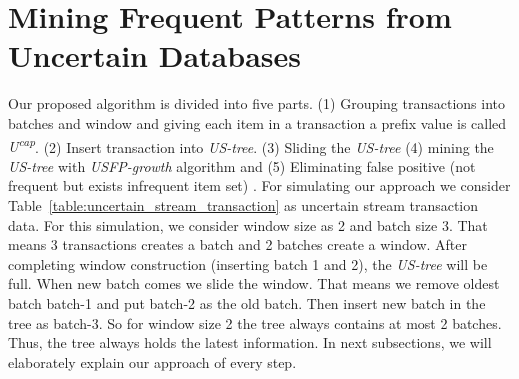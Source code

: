 \section{Mining Frequent Patterns from Uncertain Databases}
    Our proposed algorithm is divided into five parts. (1) Grouping transactions into batches and window and giving each item in a transaction a prefix value is called \emph{U\textsuperscript{cap}}. (2) Insert transaction into \emph {US-tree}. (3) Sliding the \emph {US-tree} (4) mining the \emph {US-tree} with \emph{USFP-growth} algorithm and (5) Eliminating false positive (not frequent but exists infrequent item set) . For simulating our approach we consider Table~\ref{table:uncertain_stream_transaction} as uncertain stream transaction data. For this simulation, we consider window size as 2 and batch size 3. That means 3 transactions creates a batch and 2 batches create a window. After completing window construction (inserting batch 1 and 2), the \emph {US-tree} will be full. When new batch comes we slide the window. That means we remove oldest batch batch-1 and put batch-2 as the old batch. Then insert new batch in the tree as batch-3. So for window size 2 the tree always contains at most 2 batches. Thus, the tree always holds the latest information. In next subsections, we will elaborately explain our approach of every step.

